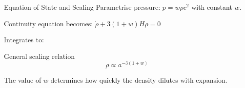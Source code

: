 \documentclass[aspectratio=169,11pt]{beamer}
\begin{document}
\begin{frame}{Equation of State and Scaling}
Parametrise pressure: $p = w\rho c^2$ with constant $w$.

\vspace{0.2cm}
Continuity equation becomes: $\dot{\rho}+3(1+w)H\rho=0$

\vspace{0.3cm}
Integrates to:
\begin{alertblock}{General scaling relation}
\begin{equation*}
    \rho \propto a^{-3(1+w)}
\end{equation*}
\end{alertblock}
The value of $w$ determines how quickly the density dilutes with expansion.
\end{frame}
\end{document}
